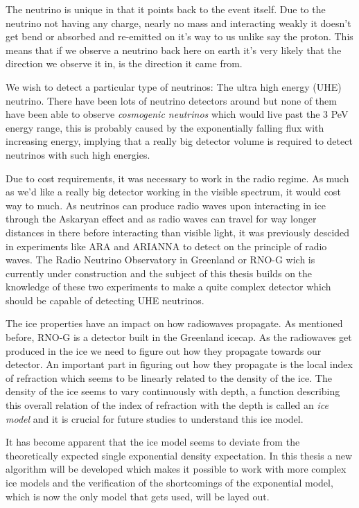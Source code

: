 \documentclass[11pt,a4paper,faculty=we,language=en,doctype=report]{cls/ugent-doc}
\begin{document}
The neutrino is unique in that it points back to the event itself.
Due to the neutrino not having any charge, nearly no mass and 
interacting weakly it doesn't get bend or absorbed and re-emitted 
on it's way to us unlike say the proton. This means that if we observe
a neutrino back here on earth it's very likely that the direction we observe
it in, is the direction it came from.

We wish to detect a particular type of neutrinos: The ultra high energy (UHE)
neutrino.  There have been lots of neutrino detectors around but none of them
have been able to observe \textit{cosmogenic neutrinos} which would live past
the 3 PeV energy range, this is probably caused by the exponentially falling
flux with increasing energy, implying that a really big detector volume is
required to detect neutrinos with such high energies. 

Due to cost requirements, it was necessary to work in the radio regime.  As
much as we'd like a really big detector working in the visible spectrum, it
would cost way to much. As neutrinos can produce radio waves upon interacting
in ice through the Askaryan effect and as radio waves can travel for way longer
distances in there before interacting than visible light, it was previously
descided in experiments like ARA and ARIANNA to detect on the principle of
radio waves. The Radio Neutrino Observatory in Greenland or RNO-G wich is
currently under construction and the subject of this thesis builds on the
knowledge of these two experiments to make a quite complex detector which
should be capable of detecting UHE neutrinos.

The ice properties have an impact on how radiowaves propagate. As mentioned before, RNO-G is a detector built
in the Greenland icecap. As the radiowaves get produced in the ice we need to figure out how
they propagate towards our detector. An important part in figuring out how they propagate is 
the local index of refraction which seems to be linearly related to the density of the ice. 
The density of the ice seems to vary continuously with depth, a function describing
this overall relation of the index of refraction with the depth is called an \textit{ice model}
and it is crucial for future studies to understand this ice model.

It has become apparent that the ice model seems to deviate from the
theoretically expected single exponential density expectation.  In this thesis
a new algorithm will be developed which makes it possible to work with more
complex ice models and the verification of the shortcomings of the exponential
model, which is now the only model that gets used, will be layed out.
\end{document}
